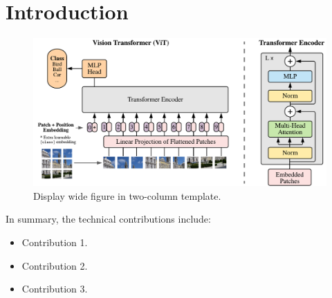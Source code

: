 \documentclass{article}
\begin{document}

\printAffiliationsAndNotice{} %


\begin{abstract}
\lipsum[1]
\end{abstract}

\section{Introduction}
\label{intro}
\begin{figure}[t]
\vskip 0.2in
\begin{center}
\centerline{\includegraphics[width=\textwidth]{img/model_scheme.pdf}}
\caption{Display wide figure in two-column template.}
\label{model_overview}
\end{center}
\vskip -0.2in
\end{figure}

\lipsum[2]

\lipsum[3]

In summary, the technical contributions include:

\begin{itemize}
\item Contribution 1.
\item Contribution 2.
\item Contribution 3.
\end{itemize}
\end{document}
